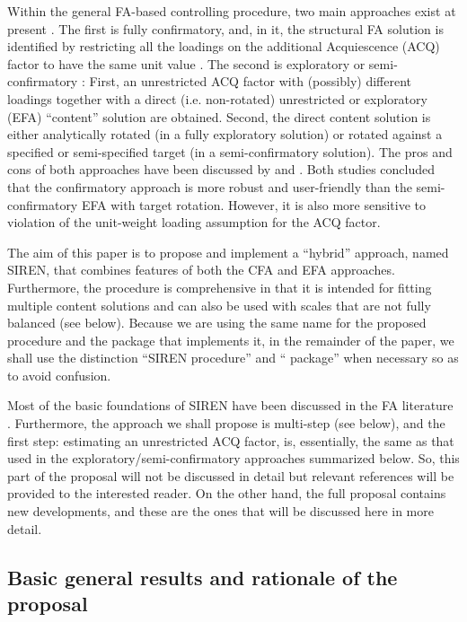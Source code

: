 Within the general FA-based controlling procedure, two main approaches exist at present \citep{Savalei:2014,delaFuente:2020}. The first is fully confirmatory, and, in it, the structural FA solution is identified by restricting all the loadings on the additional Acquiescence (ACQ) factor to have the same unit value  \citep{Billiet:2000}. The second is exploratory or semi-confirmatory  \citep{Ferrando:2003}: First, an unrestricted ACQ factor with (possibly) different loadings together with a direct (i.e. non-rotated) unrestricted or exploratory (EFA) “content” solution are obtained. Second, the direct content solution is either analytically rotated (in a fully exploratory solution) or rotated against a specified or semi-specified target (in a semi-confirmatory solution). The pros and cons of both approaches have been discussed by \citet{Savalei:2014} and \citet{delaFuente:2020}. Both studies concluded that the confirmatory approach is more robust and user-friendly than the semi-confirmatory EFA with target rotation. However, it is also more sensitive to violation of the unit-weight loading assumption for the ACQ factor.

The aim of this paper is to propose and implement a “hybrid” approach, named SIREN, that combines features of both the CFA and EFA approaches. Furthermore, the procedure is comprehensive in that it is intended for fitting multiple content solutions and can also be used with scales that are not fully balanced (see below). Because we are using the same name for the proposed procedure and the package that implements it, in the remainder of the paper, we shall use the distinction “SIREN procedure” and “ package” when necessary so as to avoid confusion.

Most of the basic foundations of SIREN have been discussed in the FA literature \citep[e.g.][]{Nunnally:1978}. Furthermore, the approach we shall propose is multi-step (see below), and the first step: estimating an unrestricted ACQ factor, is, essentially, the same as that used in the exploratory/semi-confirmatory approaches summarized below. So, this part of the proposal will not be discussed in detail but relevant references will be provided to the interested reader. On the other hand, the full proposal contains new developments, and these are the ones that will be discussed here in more detail.

\subsection{Basic general results and rationale of the proposal}

